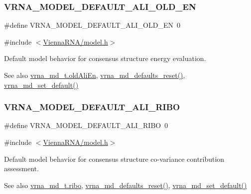\subsubsection{\texorpdfstring{VRNA\_MODEL\_DEFAULT\_ALI\_OLD\_EN}{VRNA\_MODEL\_DEFAULT\_ALI\_OLD\_EN}}
{\footnotesize\ttfamily \#define V\+R\+N\+A\+\_\+\+M\+O\+D\+E\+L\+\_\+\+D\+E\+F\+A\+U\+L\+T\+\_\+\+A\+L\+I\+\_\+\+O\+L\+D\+\_\+\+EN~0}



{\ttfamily \#include $<$\mbox{\hyperlink{model_8h}{Vienna\+R\+N\+A/model.\+h}}$>$}



Default model behavior for consensus structure energy evaluation. 

\begin{DoxySeeAlso}{See also}
\mbox{\hyperlink{group__model__details_ab53aec4503130877973c6111ae6f0f76}{vrna\+\_\+md\+\_\+t.\+old\+Ali\+En}}, \mbox{\hyperlink{group__model__details_ga70834424cf804d149937de89f80ceb45}{vrna\+\_\+md\+\_\+defaults\+\_\+reset()}}, \mbox{\hyperlink{group__model__details_ga8ac6ff84936282436f822644bf841f66}{vrna\+\_\+md\+\_\+set\+\_\+default()}} 
\end{DoxySeeAlso}
\mbox{\label{group__model__details_ga64b3ab65a9ca42d4ad1d05e193083147}} 
\subsubsection{\texorpdfstring{VRNA\_MODEL\_DEFAULT\_ALI\_RIBO}{VRNA\_MODEL\_DEFAULT\_ALI\_RIBO}}
{\footnotesize\ttfamily \#define V\+R\+N\+A\+\_\+\+M\+O\+D\+E\+L\+\_\+\+D\+E\+F\+A\+U\+L\+T\+\_\+\+A\+L\+I\+\_\+\+R\+I\+BO~0}



{\ttfamily \#include $<$\mbox{\hyperlink{model_8h}{Vienna\+R\+N\+A/model.\+h}}$>$}



Default model behavior for consensus structure co-\/variance contribution assessment. 

\begin{DoxySeeAlso}{See also}
\mbox{\hyperlink{group__model__details_a3df2ae4bd9c133ef8ab92a53b1d035ec}{vrna\+\_\+md\+\_\+t.\+ribo}}, \mbox{\hyperlink{group__model__details_ga70834424cf804d149937de89f80ceb45}{vrna\+\_\+md\+\_\+defaults\+\_\+reset()}}, \mbox{\hyperlink{group__model__details_ga8ac6ff84936282436f822644bf841f66}{vrna\+\_\+md\+\_\+set\+\_\+default()}} 
\end{DoxySeeAlso}
\mbox{\label{group__model__details_gaaaf3d73d6abc18d3889676952bfedb96}} 
